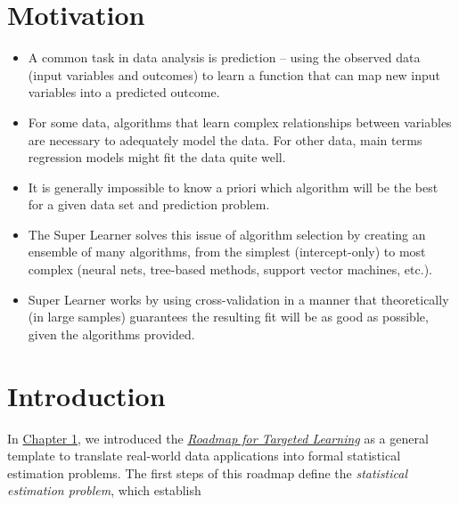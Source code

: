 \documentclass[
  12pt, krantz2,
]{book}
\providecommand{\tightlist}{%
  \setlength{\itemsep}{0pt}\setlength{\parskip}{0pt}}
\theoremstyle{definition}
\theoremstyle{definition}
\theoremstyle{definition}
\newcommand{\1}{\mathbbm{1}}
\begin{document}
\hypertarget{motivation-1}{%
\section*{Motivation}\label{motivation-1}}


\begin{itemize}
\tightlist
\item
  A common task in data analysis is prediction -- using the observed data (input
  variables and outcomes) to learn a function that can map new input variables
  into a predicted outcome.
\item
  For some data, algorithms that learn complex relationships between variables
  are necessary to adequately model the data. For other data, main terms
  regression models might fit the data quite well.
\item
  It is generally impossible to know a priori which algorithm will be the best
  for a given data set and prediction problem.
\item
  The Super Learner solves this issue of algorithm selection by creating an
  ensemble of many algorithms, from the simplest (intercept-only) to most
  complex (neural nets, tree-based methods, support vector machines, etc.).
\item
  Super Learner works by using cross-validation in a manner that theoretically
  (in large samples) guarantees the resulting fit will be as good as possible,
  given the algorithms provided.
\end{itemize}

\hypertarget{introduction-1}{%
\section*{Introduction}\label{introduction-1}}


In \protect\hyperlink{intro}{Chapter 1}, we introduced the \protect\hyperlink{roadmap}{\emph{Roadmap for Targeted
Learning}} as a general template to translate real-world data
applications into formal statistical estimation problems. The first steps of
this roadmap define the \emph{statistical estimation problem}, which establish
\end{document}
